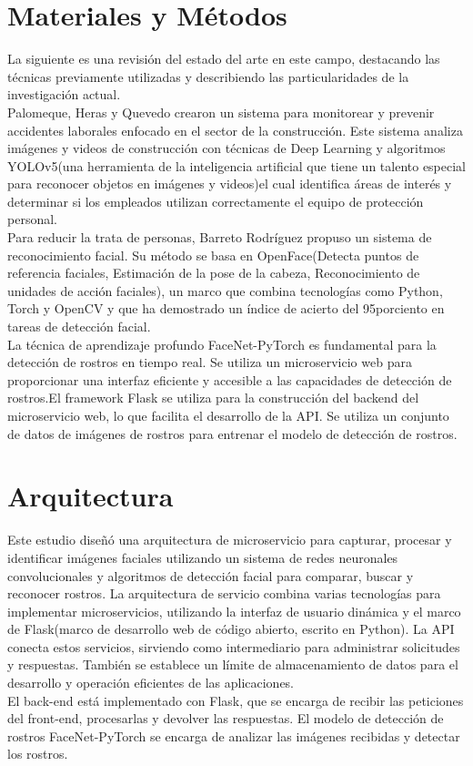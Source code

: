 \documentclass[12pt]{article}
\begin{document}
\section{Materiales y Métodos} \label{sec:firstpage}
La siguiente es una revisión del estado del arte en este campo, destacando las técnicas previamente utilizadas y describiendo las particularidades de la investigación actual.\\
Palomeque, Heras y Quevedo crearon un sistema para monitorear y prevenir accidentes laborales enfocado en el sector de la construcción. Este sistema analiza imágenes y videos de construcción con técnicas de Deep Learning y algoritmos YOLOv5(una herramienta de la inteligencia artificial que tiene un talento especial para reconocer objetos en imágenes y videos)el cual identifica áreas de interés y determinar si los empleados utilizan correctamente el equipo de protección personal.\\
Para reducir la trata de personas, Barreto Rodríguez propuso un sistema de reconocimiento facial. Su método se basa en OpenFace(Detecta puntos de referencia faciales, Estimación de la pose de la cabeza, Reconocimiento de unidades de acción faciales), un marco que combina tecnologías como Python, Torch y OpenCV y que ha demostrado un índice de acierto del 95porciento en tareas de detección facial.\\
La técnica de aprendizaje profundo FaceNet-PyTorch es fundamental para la detección de rostros en tiempo real.
Se utiliza un microservicio web para proporcionar una interfaz eficiente y accesible a las capacidades de detección de rostros.El framework Flask se utiliza para la construcción del backend del microservicio web, lo que facilita el desarrollo de la API.
Se utiliza un conjunto de datos de imágenes de rostros para entrenar el modelo de detección de rostros.
\section{Arquitectura} 
Este estudio diseñó una arquitectura de microservicio para capturar, procesar y identificar imágenes faciales utilizando un sistema de redes neuronales convolucionales y algoritmos de detección facial para comparar, buscar y reconocer rostros.
La arquitectura de servicio combina varias tecnologías para implementar microservicios, utilizando la interfaz de usuario dinámica y el marco de Flask(marco de desarrollo web de código abierto, escrito en Python). La API conecta estos servicios, sirviendo como intermediario para administrar solicitudes y respuestas. También se establece un límite de almacenamiento de datos para el desarrollo y operación eficientes de las aplicaciones.\\
El back-end está implementado con Flask, que se encarga de recibir las peticiones del front-end, procesarlas y devolver las respuestas.
El modelo de detección de rostros FaceNet-PyTorch se encarga de analizar las imágenes recibidas y detectar los rostros.
\end{document}
